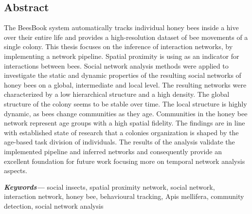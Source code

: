 %
\pagestyle{empty}
\providecommand{\keywords}[1]{\textbf{\textit{Keywords---}} #1}

\subsection*{Abstract}
The BeesBook system automatically tracks individual honey bees inside a hive over their entire life and provides a high-resolution dataset of bee movements of a single colony.
This thesis focuses on the inference of interaction networks, by implementing a network pipeline.
Spatial proximity is using as an indicator for interactions between bees.
Social network analysis methods were applied to investigate the static and dynamic properties of the resulting social networks of honey bees on a global, intermediate and local level.
The resulting networks were characterized by a low hierarchical structure and a high density.
The global structure of the colony seems to be stable over time.
The local structure is highly dynamic, as bees change communities as they age.
Communities in the honey bee network represent age groups with a high spatial fidelity.
The findings are in line with established state of research that a colonies organization is shaped by the age-based task division of individuals.
The results of the analysis validate the implemented pipeline and inferred networks and consequently provide an excellent foundation for future work focusing more on temporal network analysis aspects.

\keywords{social insects, spatial proximity network, social network, interaction network, honey bee, behavioural tracking, Apis mellifera, community detection, social network analysis}

\cleardoublepage
